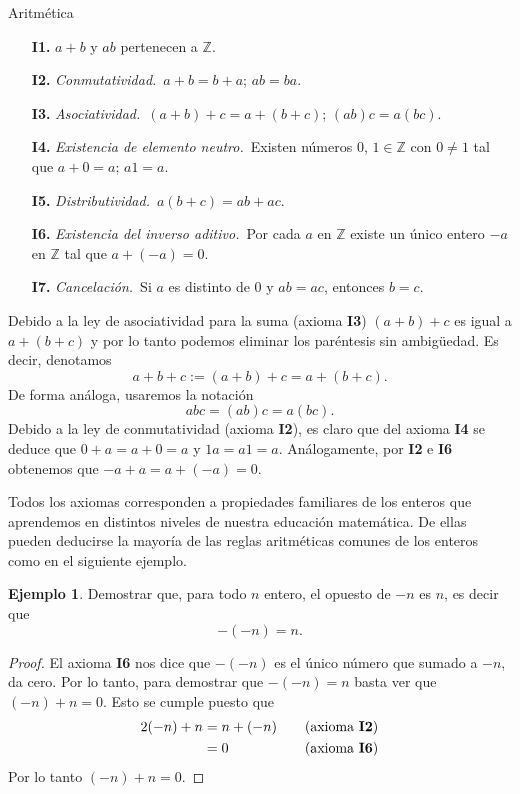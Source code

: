 \documentclass[11pt,spanish,makeidx]{amsbook}
\theoremstyle{definition}
\newtheorem{ejemplo}{Ejemplo}[section]
\theoremstyle{remark}
\begin{document}
\begin{section}{Aritmética}
\begin{enumerate}
\item[{\bf I1.}] $a+b$ y $ab$ pertenecen a ${\mathbb Z}$.
\item[{\bf I2.}] {\em Conmutatividad.}\, $a+b = b+a$; $ab=ba$. 
\item[{\bf I3.}] {\em Asociatividad.}\, $(a+b)+c = a+(b+c)$; $(ab)c = a(bc)$. 
\item[{\bf I4.}] {\em Existencia de elemento neutro.}\, Existen números $0$, $1 \in \mathbb Z$ con $0\not=1$ tal que $a+0=a$; $a1=a$. 
\item[{\bf I5.}] {\em Distributividad.}\, $a(b+c)=ab+ac$. 
\item[{\bf I6.}] {\em Existencia del inverso aditivo.}\, Por cada $a$ en ${\mathbb Z}$ existe un único entero $-a$ en ${\mathbb Z}$ tal que $a+(-a)=0$. 
\item[{\bf I7.}] {\em Cancelación.}\, Si $a$ es distinto de 0 y $ab=ac$, entonces $b=c$. 
\end{enumerate}

Debido a la ley de asociatividad para la suma (axioma {\bf I3}) $(a+b)+c$ es igual a $a+(b+c)$ y por lo tanto podemos eliminar los paréntesis sin ambigüedad. Es decir, denotamos
$$
a+b+c := (a+b)+c = a+(b+c).
$$
De forma análoga, usaremos la notación
$$
abc = (ab)c = a(bc).
$$
Debido a la ley de conmutatividad (axioma {\bf I2}), es claro que  del axioma {\bf I4} se deduce que  $0+a=a+0=a$ y $1a = a1=a$. Análogamente,  por  {\bf I2} e  {\bf I6} obtenemos que  $-a+a=a+(-a)=0$.

Todos los axiomas corresponden a propiedades familiares de los  enteros que aprendemos en distintos niveles de nuestra educación  matemática. De ellas pueden deducirse la mayoría de las reglas  aritméticas comunes de los enteros como en el siguiente ejemplo.

\begin{ejemplo}\label{Ej.opuesto_opuesto} Demostrar que, para todo $n$ entero, el opuesto de $-n$ es $n$, es decir que 
$$-(-n) = n.$$ 
\end{ejemplo}
\begin{proof} El axioma {\bf I6} nos dice que $-(-n)$ es el único número que sumado a $-n$, da cero.  Por lo tanto, para demostrar que $-(-n) = n$ basta ver que $(-n)+n=0$. Esto se cumple puesto que 
\begin{alignat*}2
(-n)+n&=n+(-n)& &\text{(axioma {\bf I2})} \\
&=0&\quad &\text{(axioma {\bf I6})}
\end{alignat*}
Por lo tanto  $(-n)+n=0$.
\end{proof}


\end{section}
\end{document}
